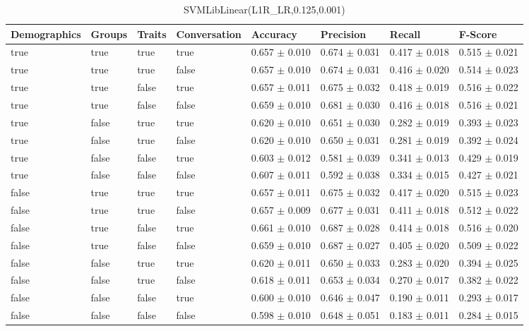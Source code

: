 \begin{table}[h]
	\centering
	\begin{tabular}{|l|l|l|l|l|l|l|l|} %
	\hline
	Demographics & Groups & Traits & Conversation & Accuracy & Precision & Recall & F-Score \\ \hline
	true & true & true & true & 0.657	\( \pm \) 0.010	& 0.674	\( \pm \) 0.031	& 0.417	\( \pm \) 0.018	& 0.515	\( \pm \) 0.021	\\ \hline
	true & true & true & false & 0.657	\( \pm \) 0.010	& 0.674	\( \pm \) 0.031	& 0.416	\( \pm \) 0.020	& 0.514	\( \pm \) 0.023	\\ \hline
	true & true & false & true & 0.657	\( \pm \) 0.011	& 0.675	\( \pm \) 0.032	& 0.418	\( \pm \) 0.019	& 0.516	\( \pm \) 0.022	\\ \hline
	true & true & false & false & 0.659	\( \pm \) 0.010	& 0.681	\( \pm \) 0.030	& 0.416	\( \pm \) 0.018	& 0.516	\( \pm \) 0.021	\\ \hline
	true & false & true & true & 0.620	\( \pm \) 0.010	& 0.651	\( \pm \) 0.030	& 0.282	\( \pm \) 0.019	& 0.393	\( \pm \) 0.023	\\ \hline
	true & false & true & false & 0.620	\( \pm \) 0.010	& 0.650	\( \pm \) 0.031	& 0.281	\( \pm \) 0.019	& 0.392	\( \pm \) 0.024	\\ \hline
	true & false & false & true & 0.603	\( \pm \) 0.012	& 0.581	\( \pm \) 0.039	& 0.341	\( \pm \) 0.013	& 0.429	\( \pm \) 0.019	\\ \hline
	true & false & false & false & 0.607	\( \pm \) 0.011	& 0.592	\( \pm \) 0.038	& 0.334	\( \pm \) 0.015	& 0.427	\( \pm \) 0.021	\\ \hline
	false & true & true & true & 0.657	\( \pm \) 0.011	& 0.675	\( \pm \) 0.032	& 0.417	\( \pm \) 0.020	& 0.515	\( \pm \) 0.023	\\ \hline
	false & true & true & false & 0.657	\( \pm \) 0.009	& 0.677	\( \pm \) 0.031	& 0.411	\( \pm \) 0.018	& 0.512	\( \pm \) 0.022	\\ \hline
	false & true & false & true & 0.661	\( \pm \) 0.010	& 0.687	\( \pm \) 0.028	& 0.414	\( \pm \) 0.018	& 0.516	\( \pm \) 0.020	\\ \hline
	false & true & false & false & 0.659	\( \pm \) 0.010	& 0.687	\( \pm \) 0.027	& 0.405	\( \pm \) 0.020	& 0.509	\( \pm \) 0.022	\\ \hline
	false & false & true & true & 0.620	\( \pm \) 0.011	& 0.650	\( \pm \) 0.033	& 0.283	\( \pm \) 0.020	& 0.394	\( \pm \) 0.025	\\ \hline
	false & false & true & false & 0.618	\( \pm \) 0.011	& 0.653	\( \pm \) 0.034	& 0.270	\( \pm \) 0.017	& 0.382	\( \pm \) 0.022	\\ \hline
	false & false & false & true & 0.600	\( \pm \) 0.010	& 0.646	\( \pm \) 0.047	& 0.190	\( \pm \) 0.011	& 0.293	\( \pm \) 0.017	\\ \hline
	false & false & false & false & 0.598	\( \pm \) 0.010	& 0.648	\( \pm \) 0.051	& 0.183	\( \pm \) 0.011	& 0.284	\( \pm \) 0.015	\\ \hline
	\end{tabular}
	\caption{SVMLibLinear(L1R\_LR,0.125,0.001)}
	\label{tab:revpol}
\end{table}
